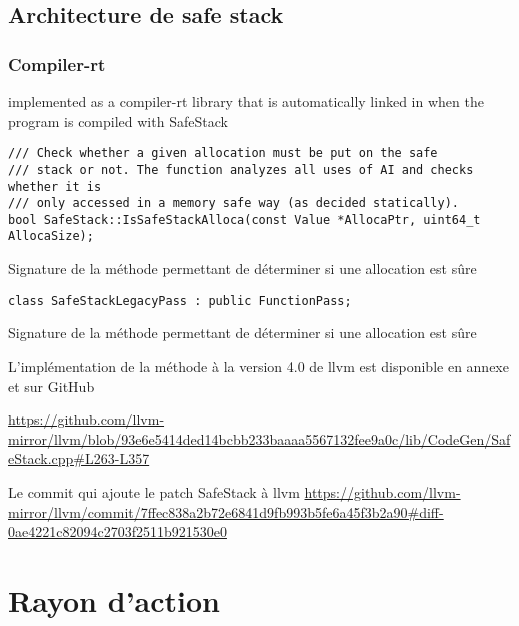 \subsection{Architecture de \og safe stack \fg}
\label{subsection:architectureSafeStack}

\subsubsection{Compiler-rt}
implemented as a compiler-rt library that is automatically linked in when the program is compiled with SafeStack



\begin{listing}
	\begin{verbatim}
/// Check whether a given allocation must be put on the safe
/// stack or not. The function analyzes all uses of AI and checks whether it is
/// only accessed in a memory safe way (as decided statically).
bool SafeStack::IsSafeStackAlloca(const Value *AllocaPtr, uint64_t AllocaSize);
	\end{verbatim}
	\caption{Signature de la méthode permettant de déterminer si une allocation est sûre}
	\label{lst:IsSafeStackAllocaHeader}
\end{listing}

\begin{listing}
	\begin{verbatim}
class SafeStackLegacyPass : public FunctionPass;
	\end{verbatim}
	\caption{Signature de la méthode permettant de déterminer si une allocation est sûre}
	\label{lst:SafeStackLegacyPassClass}
\end{listing}






L'implémentation de la méthode à la version 4.0 de \gls{llvm} est disponible en annexe et sur GitHub

\url{https://github.com/llvm-mirror/llvm/blob/93e6e5414ded14bcbb233baaaa5567132fee9a0c/lib/CodeGen/SafeStack.cpp#L263-L357}



Le commit qui ajoute le patch SafeStack à llvm
\url{https://github.com/llvm-mirror/llvm/commit/7ffec838a2b72e6841d9fb993b5fe6a45f3b2a90#diff-0ae4221c82094c2703f2511b921530e0}



\section{Rayon d'action}

